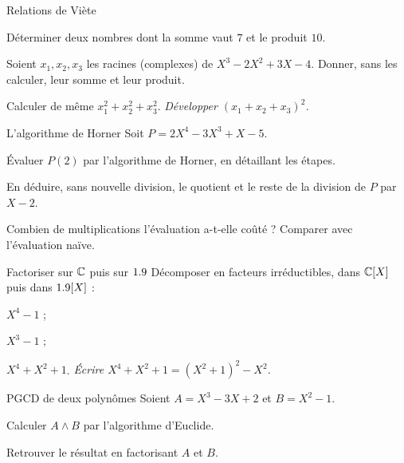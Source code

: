 \begin{exercice}[1]{Relations de Viète}
\begin{questions}
  \item Déterminer deux nombres dont la somme vaut $7$ et le produit
    $10$.
  \item Soient $x_1,x_2,x_3$ les racines (complexes) de
    $X^{3}-2X^{2}+3X-4$. Donner, sans les calculer, leur somme et leur
    produit.
  \item Calculer de même $x_1^{2}+x_2^{2}+x_3^{2}$.
    \emph{Développer $(x_1+x_2+x_3)^{2}$.}
\end{questions}
\end{exercice}

\begin{exercice}[1]{L'algorithme de Horner}
Soit $P=2X^{4}-3X^{3}+X-5$.
\begin{questions}
  \item Évaluer $P(2)$ par l'algorithme de Horner, en détaillant les
    étapes.
  \item En déduire, sans nouvelle division, le quotient et le reste de la
    division de $P$ par $X-2$.
  \item Combien de multiplications l'évaluation a-t-elle coûté ? Comparer
    avec l'évaluation naïve.
\end{questions}
\end{exercice}

\begin{exercice}[1]{Factoriser sur $\mathbb{C}$ puis sur $1.9$}
Décomposer en facteurs irréductibles, dans $\mathbb{C}[X]$ puis dans $1.9[X]$ :
\begin{questions}
  \item $X^{4}-1$ ;
  \item $X^{3}-1$ ;
  \item $X^{4}+X^{2}+1$.
    \emph{Écrire $X^{4}+X^{2}+1=(X^{2}+1)^{2}-X^{2}$.}
\end{questions}
\end{exercice}

\begin{exercice}[1]{PGCD de deux polynômes}
Soient $A=X^{3}-3X+2$ et $B=X^{2}-1$.
\begin{questions}
  \item Calculer $A\wedge B$ par l'algorithme d'Euclide.
  \item Retrouver le résultat en factorisant $A$ et $B$.
\end{questions}
\end{exercice}


